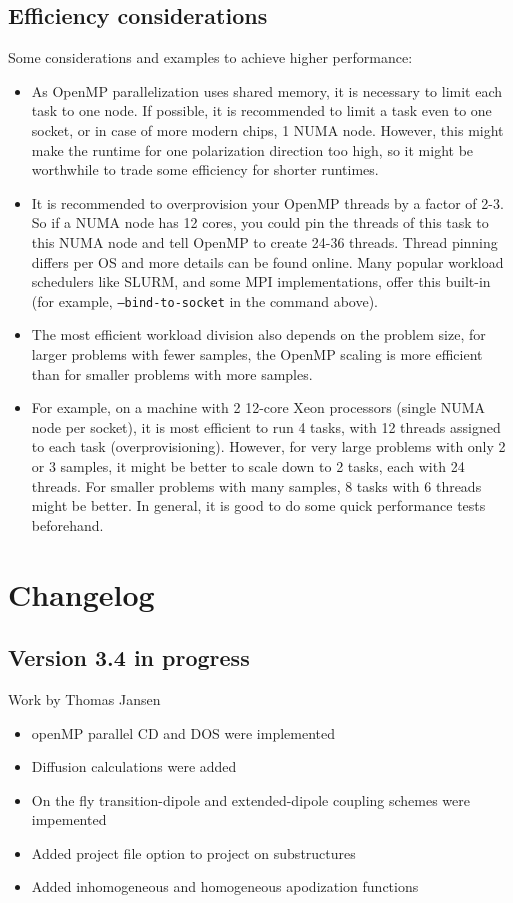 \documentclass[12pt]{book}
\begin{document}
\subsection{Efficiency considerations}
Some considerations and examples to achieve higher performance:
\begin{itemize}
\item As OpenMP parallelization uses shared memory, it is necessary to limit each task to one node. If possible, it is recommended to limit a task even to one socket, or in case of more modern chips, 1 NUMA node. However, this might make the runtime for one polarization direction too high, so it might be worthwhile to trade some efficiency for shorter runtimes.
\item It is recommended to overprovision your OpenMP threads by a factor of 2-3. So if a NUMA node has 12 cores, you could pin the threads of this task to this NUMA node and tell OpenMP to create 24-36 threads. Thread pinning differs per OS and more details can be found online. Many popular workload schedulers like SLURM, and some MPI implementations, offer this built-in (for example, {\tt --bind-to-socket} in the command above).
\item The most efficient workload division also depends on the problem size, for larger problems with fewer samples, the OpenMP scaling is more efficient than for smaller problems with more samples.
\item For example, on a machine with 2 12-core Xeon processors (single NUMA node per socket), it is most efficient to run 4 tasks, with 12 threads assigned to each task (overprovisioning). However, for very large problems with only 2 or 3 samples, it might be better to scale down to 2 tasks, each with 24 threads. For smaller problems with many samples, 8 tasks with 6 threads might be better. In general, it is good to do some quick performance tests beforehand.
\end{itemize}

\section{Changelog}
\subsection{Version 3.4 in progress}
{\small Work by Thomas Jansen}
\begin{itemize}
\item openMP parallel CD and DOS were implemented
\item Diffusion calculations were added
\item On the fly transition-dipole and extended-dipole coupling schemes were impemented
\item Added project file option to project on substructures
\item Added inhomogeneous and homogeneous apodization functions
\end{itemize}
\end{document}
